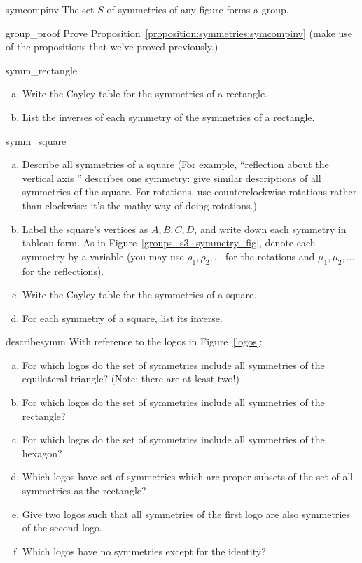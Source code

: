 \begin{prop}{symcompinv}
The set $S$ of symmetries of any figure forms a group.
\end{prop}

\begin{exercise}{group_proof}
Prove Proposition~\ref{proposition:symmetries:symcompinv} (make use of the propositions that we've proved previously.)
\end{exercise}

\bigskip
\begin{exercise}{symm_rectangle}
\begin{enumerate}[(a)]
\item
Write the Cayley table for the symmetries of a rectangle.
\item
List the inverses of each symmetry of the symmetries of a rectangle.
\end{enumerate}
\end{exercise}

\begin{exercise}{symm_square}
\begin{enumerate}[(a)]
\item
Describe all symmetries of a square  (For example, ``reflection about the vertical axis '' describes one symmetry: give similar descriptions of all symmetries of the square. For rotations, use counterclockwise rotations rather than clockwise: it's the mathy way of doing rotations.)
\item
Label the square's vertices as $A, B, C, D$, and write down each symmetry in tableau form. As in Figure~\ref{groups_s3_symmetry_fig}, denote each symmetry by a variable (you may use $\rho_1, \rho_2, \ldots$ for the rotations and $\mu_1, \mu_2, \ldots$ for the reflections).
\item
Write the Cayley table for the symmetries of a square.
\item
For each symmetry of a square, list its inverse.
\end{enumerate}
\end{exercise}

\begin{exercise}{describesymm}
With reference to the logos in Figure~\ref{logos}:
\begin{enumerate}[(a)]
\item
For which logos do the set of symmetries include all symmetries of the equilateral triangle? (Note: there are at least two!)
\item
For which logos do the set of symmetries include all symmetries of the rectangle?
\item
For which logos do the set of symmetries include all symmetries of the hexagon?
\item
Which logos have set of symmetries which are proper subsets of the set of all symmetries as the rectangle?
\item
Give two logos such that all symmetries of the first logo are also symmetries of the second logo.
\item
Which logos have no symmetries except for the identity?
\end{enumerate}
\end{exercise}  

